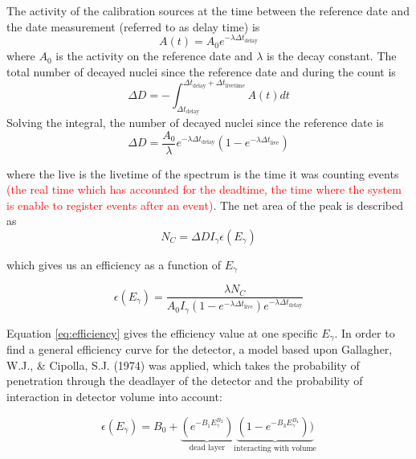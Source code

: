 \documentclass[a4paper,11pt,twoside]{book}
\begin{document}
\noindent 
The activity of the calibration sources at the time between the reference date and the date measurement (referred to as delay time) is 
\begin{equation}
    A(t) = A_0 e^{-\lambda \Delta t_\text{delay}}
\end{equation}
\noindent
where $A_0$ is the activity on the reference date and $\lambda$ is the decay constant. The total number of decayed nuclei since the reference date and during the count is 
\begin{equation}
\Delta D = -\int_{\Delta t_\text{delay}}^{\Delta t_\text{delay}+\Delta t_\text{livetime}} A(t)dt
\end{equation}
\noindent 
Solving the integral, the number of decayed nuclei since the reference date is 
\begin{equation}
    \Delta D = \frac{A_0}{\lambda}e^{-\lambda \Delta t_\text{delay}}(1-e^{-\lambda \Delta t_\text{live}})
\end{equation}

\noindent
where the live is the livetime of the spectrum is the time it was counting events \textcolor{red}{(the real time which has accounted for the deadtime, the time where the system is enable to register events after an event)}. 
The net area of the peak is described as 
\begin{equation}
    N_C = \Delta D I_\gamma \epsilon(E_\gamma)
\end{equation} 

\noindent 
which gives us an efficiency as a function of $E_\gamma$

\begin{equation} \label{eq:efficiency}
\epsilon(E_\gamma)=\frac{\lambda N_C}{A_0 I_\gamma(1-e^{-\lambda \Delta t_\text{live}})e^{-\lambda \Delta t_\text{delay}}}
\end{equation}

\noindent
Equation \ref{eq:efficiency} gives the efficiency value at one specific $E_\gamma$. In order to find a general efficiency curve for the detector, a model based upon  Gallagher, W.J., \& Cipolla, S.J. (1974) was applied, which takes the probability of penetration through the deadlayer of the detector and the probability of interaction in detector volume into account: 

\begin{equation} \label{eq:efficiency_estimated}
\epsilon(E_\gamma) =  B_0 + \underbrace{(e^{-B_1 E_\gamma^{B_2}})}_\text{dead layer}  \underbrace{(1-e^{-B_3 E_\gamma^{B_4}}))}_\text{interacting with volume} 
\end{equation}
\noindent
\end{document}
